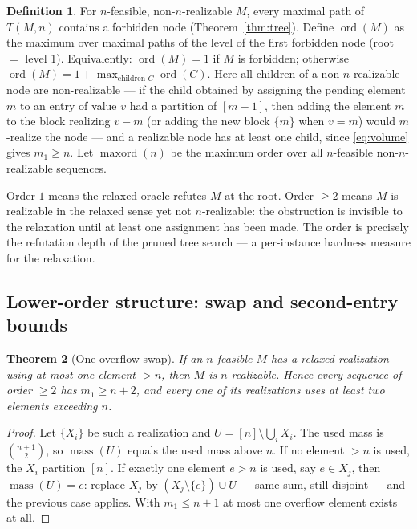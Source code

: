 \documentclass[11pt]{article}
\newtheorem{theorem}{Theorem}[section]
\theoremstyle{definition}
\newtheorem{definition}[theorem]{Definition}
\theoremstyle{remark}
\newcommand{\mass}{\operatorname{mass}}
\newcommand{\ord}{\operatorname{ord}}
\newcommand{\maxord}{\operatorname{maxord}}
\newcommand{\intv}[1]{[#1]}
\begin{document}
\begin{definition}\label{def:order}
For $n$-feasible, non-$n$-realizable $M$, every maximal path of $T(M,n)$ contains a
forbidden node (Theorem~\ref{thm:tree}). Define $\ord(M)$ as the maximum over
maximal paths of the level of the first forbidden node (root $=$ level 1).
Equivalently: $\ord(M)=1$ if $M$ is forbidden; otherwise
$\ord(M)=1+\max_{\text{children }C}\ord(C)$. Here all children of a
non-$n$-realizable node are non-realizable --- if the child obtained by assigning
the pending element $m$ to an entry of value $v$ had a partition of $\intv{m-1}$,
then adding the element $m$ to the block realizing $v-m$ (or adding the new block
$\{m\}$ when $v=m$) would $m$-realize the node --- and a realizable node has at
least one child, since \eqref{eq:volume} gives $m_1\ge n$. Let $\maxord(n)$ be the maximum order over all
$n$-feasible non-$n$-realizable sequences.
\end{definition}

Order $1$ means the relaxed oracle refutes $M$ at the root. Order $\ge2$ means $M$
is realizable in the relaxed sense yet not $n$-realizable: the obstruction is
invisible to the relaxation until at least one assignment has been made. The order
is precisely the refutation depth of the pruned tree search --- a per-instance
hardness measure for the relaxation.

\subsection{Lower-order structure: swap and second-entry bounds}

\begin{theorem}[One-overflow swap]\label{thm:swap}
If an $n$-feasible $M$ has a relaxed realization using at most one element $>n$,
then $M$ is $n$-realizable. Hence every sequence of order $\ge2$ has $m_1\ge n+2$,
and every one of its realizations uses at least two elements exceeding $n$.
\end{theorem}

\begin{proof}
Let $\{X_i\}$ be such a realization and $U=\intv n\setminus\bigcup_iX_i$. The used
mass is $\binom{n+1}{2}$, so $\mass(U)$ equals the used mass above $n$. If no
element $>n$ is used, the $X_i$ partition $\intv n$. If exactly one element $e>n$ is
used, say $e\in X_j$, then $\mass(U)=e$: replace $X_j$ by
$(X_j\setminus\{e\})\cup U$ --- same sum, still disjoint --- and the previous case
applies. With $m_1\le n+1$ at most one overflow element exists at all.
\end{proof}
\end{document}
